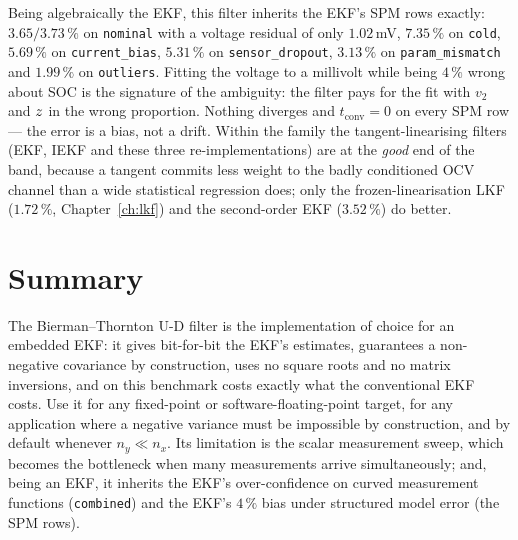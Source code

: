 Being algebraically the EKF, this filter inherits the EKF's SPM rows exactly:
$3.65/3.73\,\%$ on \texttt{nominal} with a voltage residual of only $1.02$\,mV,
$7.35\,\%$ on \texttt{cold}, $5.69\,\%$ on \texttt{current\_bias}, $5.31\,\%$ on
\texttt{sensor\_dropout}, $3.13\,\%$ on \texttt{param\_mismatch} and $1.99\,\%$ on
\texttt{outliers}. Fitting the voltage to a millivolt while being $4\,\%$ wrong about SOC is
the signature of the ambiguity: the filter pays for the fit with $v_2$ and $z$ in the wrong
proportion. Nothing diverges and $t_{\text{conv}} = 0$ on every SPM row --- the error is a
bias, not a drift. Within the family the tangent-linearising filters (EKF, IEKF and these three
re-implementations) are at the \emph{good} end of the band, because a tangent commits less
weight to the badly conditioned OCV channel than a wide statistical regression does; only the
frozen-linearisation LKF ($1.72\,\%$, Chapter~\ref{ch:lkf}) and the second-order EKF
($3.52\,\%$) do better.

\section{Summary}
The Bierman--Thornton U-D filter is the implementation of choice for an embedded EKF: it gives
bit-for-bit the EKF's estimates, guarantees a non-negative covariance by construction, uses no
square roots and no matrix inversions, and on this benchmark costs exactly what the conventional
EKF costs. Use it for any fixed-point or software-floating-point target, for any application
where a negative variance must be impossible by construction, and by default whenever
$n_y\ll n_x$. Its limitation is the scalar measurement sweep, which becomes the bottleneck when
many measurements arrive simultaneously; and, being an EKF, it inherits the EKF's
over-confidence on curved measurement functions (\texttt{combined}) and the EKF's $4\,\%$ bias
under structured model error (the SPM rows).
